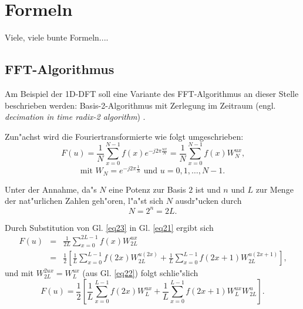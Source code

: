\chapter{Formeln}
\label{formeln}
\thispagestyle{empty}

Viele, viele bunte Formeln....


\section{FFT-Algorithmus}

Am  Beispiel der 1D-DFT soll eine Variante des FFT-Algorithmus
an  dieser  Stelle  beschrieben werden: Basis-2-Algorithmus
mit Zerlegung im Zeitraum (engl. {\em decimation in time 
radix-2  algorithm}) \cite{gonzalez92bsp}.

 Zun"achst wird die Fouriertransformierte wie folgt umgeschrieben:
\begin{equation} 
 \label{eq21}
F(u) = \frac{1}{N} \sum \limits_{x=0}^{N-1}f(x) e^{ -j 2 \pi \frac{u x}{N} }
  = \frac{1}{N} \sum \limits_{x=0}^{N-1}f(x) W_{N}^{ux}
\textrm{,}
\end{equation}
\begin{equation}
\label{eq22}
\textrm{mit  }
  W_{N} = e^{ -j 2 \pi \frac{1}{N} }
\textrm{  und  $u=0,1,\dots,N-1$.}
\end{equation}

Unter  der Annahme, da"s $N$ eine Potenz zur Basis $2$ ist  und
$n$ und $L$ zur Menge der nat"urlichen Zahlen geh"oren, l"a"st sich
$N$ ausdr"ucken durch
\begin{equation}
\label{eq23}
N=2^{n}=2L
\textrm{.}
\end{equation}

Durch Substitution von Gl. \ref{eq23} in Gl. \ref{eq21} ergibt sich
\begin{eqnarray} 
\label{eq24}
F(u) &=& \frac{1}{2L} \sum \limits_{x=0}^{2L-1}f(x) W_{2L}^{ux} \nonumber \\
  &=& \frac{1}{2} \left [ \frac{1}{L} \sum \limits_{x=0}^{L-1}f(2x) W_{2L}^{u(2x)} +
     \frac{1}{L} \sum \limits_{x=0}^{L-1}f(2x+1) W_{2L}^{u(2x+1)} \right ]
\textrm{,}
\end{eqnarray}
und mit $W_{2L}^{2ux} = W_{L}^{ux}$ (aus Gl. \ref{eq22}) folgt schlie"slich
\begin{equation}
\label{eq25}
F(u) = \frac{1}{2} \left [ \frac{1}{L} \sum \limits_{x=0}^{L-1}f(2x) W_{L}^{ux}+
     \frac{1}{L} \sum \limits_{x=0}^{L-1}f(2x+1) W_{L}^{ux} W_{2L}^{u} \right ]
\textrm{.}
\end{equation}

